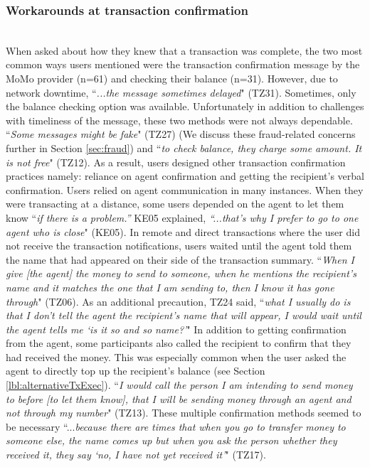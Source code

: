 \subsubsection{Workarounds at transaction confirmation}
\label{sec:tx_confirmation_workarounds}
\mbox{}
\\
When asked about how they knew that a transaction was complete, the two most common ways users mentioned were the transaction confirmation message by the MoMo provider (n=61) and checking their balance (n=31). However, due to network downtime, ``\textit{...the message sometimes delayed}" (TZ31). Sometimes, only the balance checking option was available. Unfortunately in addition to challenges with timeliness of the message, these two methods were not always dependable. ``\textit{Some messages might be fake}" (TZ27) (We discuss these fraud-related concerns further in Section \ref{sec:fraud}) and ``\textit{to check balance, they charge some amount. It is not free}" (TZ12). As a result, users designed other transaction confirmation practices namely: reliance on agent confirmation and getting the recipient's verbal confirmation.
 Users relied on agent communication in many instances. When they were transacting at a distance, some users depended on the agent to let them know ``\textit{if there is a problem.''}  KE05 explained, \textit{``...that’s why I prefer to go to one agent who is close}" (KE05). In remote and direct transactions where the user did not receive the transaction notifications, users waited until the agent told them the name that had appeared on their side of the transaction summary. ``\textit{When I give [the agent] the money to send to someone, when he mentions the recipient’s name and it matches the one that I am sending to, then I know it has gone through}" (TZ06). As an additional precaution, TZ24 said, ``\textit{what I usually do is that I don’t tell the agent the recipient’s name that will appear, I would wait until the agent tells me ‘is it so and so name?’}"
In addition to getting confirmation from the agent, some participants also called the recipient to confirm that they had received the money. This was especially common when the user asked the agent to directly top up the recipient's balance (see Section \ref{lbl:alternativeTxExec}). ``\textit{I would call the person I am intending to send money to before [to let them know], that I will be sending money through an agent and not through my number}" (TZ13). %
These multiple confirmation methods seemed to be necessary ``...\textit{because there are times that when you go to transfer money to someone else, the name comes up but when you ask the person whether they received it, they say ‘no, I have not yet received it'}" (TZ17).

